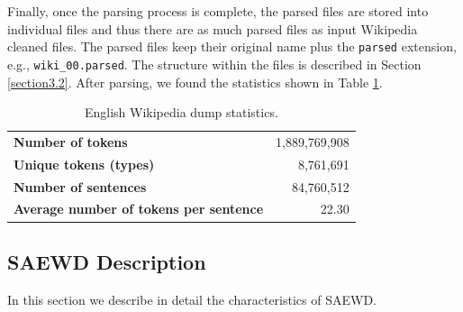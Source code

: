  Finally, once the parsing process is complete, the parsed files are stored into individual files and thus there are as much parsed files as input Wikipedia cleaned files. The parsed files keep their original name plus the \texttt{parsed} extension, e.g., \texttt{wiki\_00.parsed}. The structure within the files is described in Section \ref{section3.2}. After parsing, we found the statistics shown in Table \ref{tab:corpus_stats}.
 
\begin{table}[t]
\centering
\caption{English Wikipedia dump statistics.}
\label{tab:corpus_stats}
\begin{tabular}{lr}
{\bf Number of tokens}      & 1,889,769,908 \\
{\bf Unique tokens (types)} & 8,761,691 \\
{\bf Number of sentences}   &  84,760,512\\
{\bf Average number of tokens per sentence} & 22.30
\end{tabular}
\end{table}

\subsection{SAEWD Description}\label{text:description}
In this section we describe in detail the characteristics of SAEWD.




